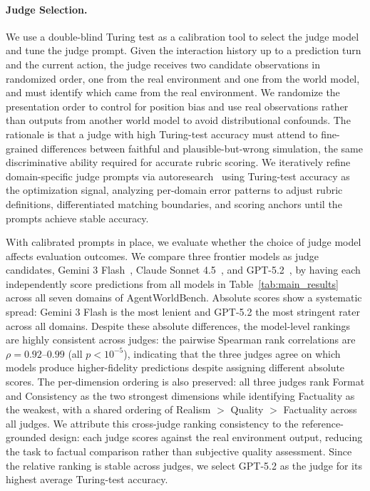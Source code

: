 \documentclass{llmxive}
\providecommand{\bench}{AgentWorldBench\xspace}
\begin{document}
\paragraph{Judge Selection.}
\label{sec:bench:judge}
We use a double-blind Turing test as a calibration tool to select the judge model and tune the judge prompt.
Given the interaction history up to a prediction turn and the current action, the judge receives two candidate observations in randomized order, one from the real environment and one from the world model, and must identify which came from the real environment.
We randomize the presentation order to control for position bias and use real observations rather than outputs from another world model to avoid distributional confounds.
The rationale is that a judge with high Turing-test accuracy must attend to fine-grained differences between faithful and plausible-but-wrong simulation, the same discriminative ability required for accurate rubric scoring.
We iteratively refine domain-specific judge prompts via autoresearch~\citep{karpathy2026autoresearch} using Turing-test accuracy as the optimization signal, analyzing per-domain error patterns to adjust rubric definitions, differentiated matching boundaries, and scoring anchors until the prompts achieve stable accuracy.

With calibrated prompts in place, we evaluate whether the choice of judge model affects evaluation outcomes.
We compare three frontier models as judge candidates, Gemini 3 Flash~\citep{gemini3flash}, Claude Sonnet 4.5~\citep{sonnet4.5}, and GPT-5.2~\citep{gpt-5.2}, by having each independently score predictions from all models in Table~\ref{tab:main_results} across all seven domains of \bench{}.
Absolute scores show a systematic spread: Gemini 3 Flash is the most lenient and GPT-5.2 the most stringent rater across all domains.
Despite these absolute differences, the model-level rankings are highly consistent across judges: the pairwise Spearman rank correlations are $\rho = 0.92$--$0.99$ (all $p < 10^{-5}$), indicating that the three judges agree on which models produce higher-fidelity predictions despite assigning different absolute scores.
The per-dimension ordering is also preserved: all three judges rank Format and Consistency as the two strongest dimensions while identifying Factuality as the weakest, with a shared ordering of Realism $>$ Quality $>$ Factuality across all judges.
We attribute this cross-judge ranking consistency to the reference-grounded design: each judge scores against the real environment output, reducing the task to factual comparison rather than subjective quality assessment.
Since the relative ranking is stable across judges, we select GPT-5.2 as the judge for its highest average Turing-test accuracy.
\end{document}
